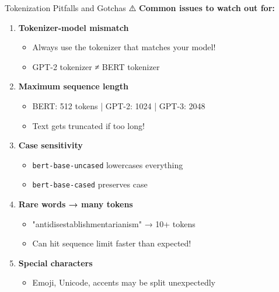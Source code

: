 \documentclass[aspectratio=169]{beamer}
\begin{document}
\begin{frame}[shrink=10]{Tokenization Pitfalls and Gotchas ⚠️}
    \textbf{Common issues to watch out for:}

    \begin{enumerate}\setlength{\itemsep}{0pt}
        \item \textbf{Tokenizer-model mismatch}
        \begin{itemize}\setlength{\itemsep}{0pt}
            \item Always use the tokenizer that matches your model!
            \item GPT-2 tokenizer ≠ BERT tokenizer
        \end{itemize}

        \item \textbf{Maximum sequence length}
        \begin{itemize}\setlength{\itemsep}{0pt}
            \item BERT: 512 tokens | GPT-2: 1024 | GPT-3: 2048
            \item Text gets truncated if too long!
        \end{itemize}

        \item \textbf{Case sensitivity}
        \begin{itemize}\setlength{\itemsep}{0pt}
            \item \texttt{bert-base-uncased} lowercases everything
            \item \texttt{bert-base-cased} preserves case
        \end{itemize}

        \item \textbf{Rare words → many tokens}
        \begin{itemize}\setlength{\itemsep}{0pt}
            \item "antidisestablishmentarianism" → 10+ tokens
            \item Can hit sequence limit faster than expected!
        \end{itemize}

        \item \textbf{Special characters}
        \begin{itemize}\setlength{\itemsep}{0pt}
            \item Emoji, Unicode, accents may be split unexpectedly
        \end{itemize}
    \end{enumerate}
\end{frame}
\end{document}
